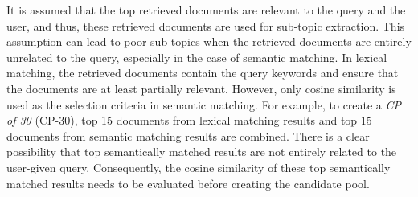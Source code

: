 
It is assumed that the top retrieved documents are relevant to the query and the user, and thus, these retrieved documents are used for sub-topic extraction. This assumption can lead to poor sub-topics when the retrieved documents are entirely unrelated to the query, especially in the case of semantic matching. In lexical matching, the retrieved documents contain the query keywords and ensure that the documents are at least partially relevant. However, only cosine similarity is used as the selection criteria in semantic matching. For example, to create a \textit{\ac{CP} of 30} (\ac{CP}-30), top 15 documents from lexical matching results and top 15 documents from semantic matching results are combined. There is a clear possibility that top semantically matched results are not entirely related to the user-given query. Consequently, the cosine similarity of these top semantically matched results needs to be evaluated before creating the candidate pool.

